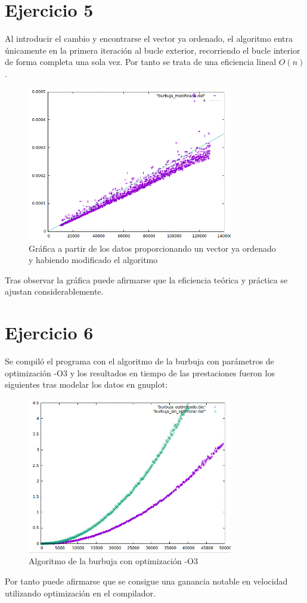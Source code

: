 \documentclass[paper=a4, fontsize=10pt]{scrartcl} %
\begin{document}
\section{Ejercicio 5}

Al introducir el cambio y encontrarse el vector ya ordenado, el algoritmo entra únicamente en la primera iteración al bucle exterior, recorriendo el bucle interior de forma completa una sola vez. Por tanto se trata de una eficiencia lineal $O(n)$.

\begin{figure}[H] %
	\centering
	\label{lsblk}
	\includegraphics[width=0.8\textwidth]{../imgs/ejercicio5.PNG}
	\caption{Gráfica a partir de los datos proporcionando un vector ya ordenado y habiendo modificado el algoritmo} 
\end{figure}

Tras observar la gráfica puede afirmarse que la eficiencia teórica y práctica se ajustan considerablemente.
\section{Ejercicio 6}
Se compiló el programa con el algoritmo de la burbuja con parámetros de optimización -O3 y los resultados en tiempo de las prestaciones fueron los siguientes tras modelar los datos en gnuplot:

\begin{figure}[H] %
	\centering
	\label{lsblk}
	\includegraphics[width=0.8\textwidth]{../imgs/ejercicio6.PNG}
	\caption{Algoritmo de la burbuja con optimización -O3} 
\end{figure}

Por tanto puede afirmarse que se consigue una ganancia notable en velocidad utilizando optimización en el compilador.
\end{document}

